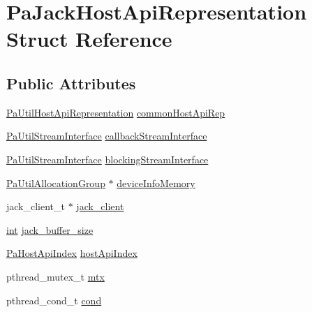\hypertarget{struct_pa_jack_host_api_representation}{}\section{Pa\+Jack\+Host\+Api\+Representation Struct Reference}
\label{struct_pa_jack_host_api_representation}
\subsection*{Public Attributes}
\begin{DoxyCompactItemize}
\item 
\hyperlink{struct_pa_util_host_api_representation}{Pa\+Util\+Host\+Api\+Representation} \hyperlink{struct_pa_jack_host_api_representation_ae48a62bf0169aab8612d7435f10cf9d7}{common\+Host\+Api\+Rep}
\item 
\hyperlink{struct_pa_util_stream_interface}{Pa\+Util\+Stream\+Interface} \hyperlink{struct_pa_jack_host_api_representation_a1a68d0e2089e255ebdb7fb001d9d3b60}{callback\+Stream\+Interface}
\item 
\hyperlink{struct_pa_util_stream_interface}{Pa\+Util\+Stream\+Interface} \hyperlink{struct_pa_jack_host_api_representation_acaf1738e1054ff56d469cab3202acebf}{blocking\+Stream\+Interface}
\item 
\hyperlink{struct_pa_util_allocation_group}{Pa\+Util\+Allocation\+Group} $\ast$ \hyperlink{struct_pa_jack_host_api_representation_a5665589d64d32a510b85346b23da38c0}{device\+Info\+Memory}
\item 
jack\+\_\+client\+\_\+t $\ast$ \hyperlink{struct_pa_jack_host_api_representation_a42d2cc0802246a6829096862bddd9123}{jack\+\_\+client}
\item 
\hyperlink{xmltok_8h_a5a0d4a5641ce434f1d23533f2b2e6653}{int} \hyperlink{struct_pa_jack_host_api_representation_a4cef17ffae2034e74e82a44c7526c5ca}{jack\+\_\+buffer\+\_\+size}
\item 
\hyperlink{portaudio_8h_aeef6da084c57c70aa94be97411e19930}{Pa\+Host\+Api\+Index} \hyperlink{struct_pa_jack_host_api_representation_a6fb33fc101d36b95c209a0c6c696ec44}{host\+Api\+Index}
\item 
pthread\+\_\+mutex\+\_\+t \hyperlink{struct_pa_jack_host_api_representation_a46492bb237e9f6edd9de5936a9cb62e3}{mtx}
\item 
pthread\+\_\+cond\+\_\+t \hyperlink{struct_pa_jack_host_api_representation_a14fb0a838735f2302de25324fd7754a3}{cond}
\item 

\end{DoxyCompactItemize}
